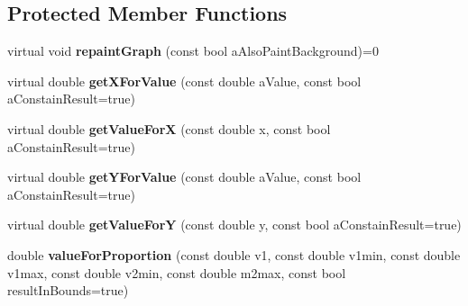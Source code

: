 \subsection*{Protected Member Functions}
\begin{DoxyCompactItemize}
\item 
\hypertarget{class_graph_view_abstract_a5b42853690677e795d794245d8a04baa}{virtual void {\bfseries repaint\-Graph} (const bool a\-Also\-Paint\-Background)=0}\label{class_graph_view_abstract_a5b42853690677e795d794245d8a04baa}

\item 
\hypertarget{class_graph_view_abstract_a8ea46c408d2173deba5e08fb6edca367}{virtual double {\bfseries get\-X\-For\-Value} (const double a\-Value, const bool a\-Constain\-Result=true)}\label{class_graph_view_abstract_a8ea46c408d2173deba5e08fb6edca367}

\item 
\hypertarget{class_graph_view_abstract_abdfd9acceedbb28890574461f2f81e39}{virtual double {\bfseries get\-Value\-For\-X} (const double x, const bool a\-Constain\-Result=true)}\label{class_graph_view_abstract_abdfd9acceedbb28890574461f2f81e39}

\item 
\hypertarget{class_graph_view_abstract_a983785595452770139504ddf06e0d556}{virtual double {\bfseries get\-Y\-For\-Value} (const double a\-Value, const bool a\-Constain\-Result=true)}\label{class_graph_view_abstract_a983785595452770139504ddf06e0d556}

\item 
\hypertarget{class_graph_view_abstract_a7a796d769931044cd6dfe15f585d8e1c}{virtual double {\bfseries get\-Value\-For\-Y} (const double y, const bool a\-Constain\-Result=true)}\label{class_graph_view_abstract_a7a796d769931044cd6dfe15f585d8e1c}

\item 
\hypertarget{class_graph_view_abstract_af3e6e8c1f967c1919326426923271b8d}{double {\bfseries value\-For\-Proportion} (const double v1, const double v1min, const double v1max, const double v2min, const double m2max, const bool result\-In\-Bounds=true)}\label{class_graph_view_abstract_af3e6e8c1f967c1919326426923271b8d}

\end{DoxyCompactItemize}
